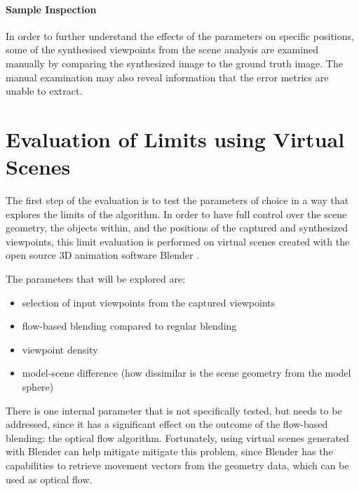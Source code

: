 \paragraph{Sample Inspection}
In order to further understand the effects of the parameters on specific positions, some of the synthesised viewpoints from the scene analysis are examined manually by comparing the synthesized image to the ground truth image. The manual examination may also reveal information that the error metrics are unable to extract.

\section{Evaluation of Limits using Virtual Scenes}
The first step of the evaluation is to test the parameters of choice in a way that explores the limits of the algorithm. In order to have full control over the scene geometry, the objects within, and the positions of the captured and synthesized viewpoints, this limit evaluation is performed on virtual scenes created with the open source 3D animation software Blender \cite{blender}.

The parameters that will be explored are:
\begin{itemize}
  \item selection of input viewpoints from the captured viewpoints
  \item flow-based blending compared to regular blending
  \item viewpoint density
  \item model-scene difference (how dissimilar is the scene geometry from the model sphere)
\end{itemize}


There is one internal parameter that is not specifically tested, but needs to be addressed, since it has a significant effect on the outcome of the flow-based blending: the optical flow algorithm. Fortunately, using virtual scenes generated with Blender can help mitigate mitigate this problem, since Blender has the capabilities to retrieve movement vectors from the geometry data, which can be used as optical flow.

